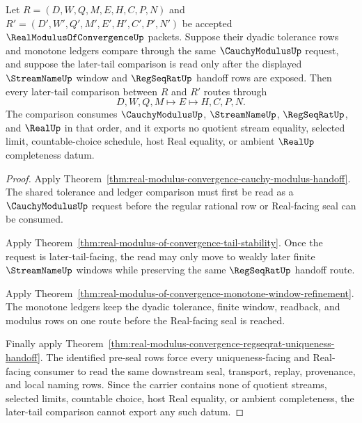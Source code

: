\begin{theorem}
\label{thm:real-modulus-of-convergence-tail-comparison-route}
Let $R=(D,W,Q,M,E,H,C,P,N)$ and $R'=(D',W',Q',M',E',H',C',P',N')$ be accepted $\RealModulusOfConvergenceUp$ packets. Suppose their dyadic tolerance rows and monotone ledgers compare through the same $\CauchyModulusUp$ request, and suppose the later-tail comparison is read only after the displayed $\StreamNameUp$ window and $\RegSeqRatUp$ handoff rows are exposed. Then every later-tail comparison between $R$ and $R'$ routes through
$$
D,W,Q,M \longmapsto E \longmapsto H,C,P,N .
$$
The comparison consumes $\CauchyModulusUp$, $\StreamNameUp$, $\RegSeqRatUp$, and $\RealUp$ in that order, and it exports no quotient stream equality, selected limit, countable-choice schedule, host Real equality, or ambient $\RealUp$ completeness datum.
\end{theorem}
\begin{proof}
Apply Theorem~\ref{thm:real-modulus-convergence-cauchy-modulus-handoff}. The shared tolerance and ledger comparison must first be read as a $\CauchyModulusUp$ request before the regular rational row or Real-facing seal can be consumed.

Apply Theorem~\ref{thm:real-modulus-of-convergence-tail-stability}. Once the request is later-tail-facing, the read may only move to weakly later finite $\StreamNameUp$ windows while preserving the same $\RegSeqRatUp$ handoff route.

Apply Theorem~\ref{thm:real-modulus-of-convergence-monotone-window-refinement}. The monotone ledgers keep the dyadic tolerance, finite window, readback, and modulus rows on one route before the Real-facing seal is reached.

Finally apply Theorem~\ref{thm:real-modulus-convergence-regseqrat-uniqueness-handoff}. The identified pre-seal rows force every uniqueness-facing and Real-facing consumer to read the same downstream seal, transport, replay, provenance, and local naming rows. Since the carrier contains none of quotient streams, selected limits, countable choice, host Real equality, or ambient completeness, the later-tail comparison cannot export any such datum.
\end{proof}

